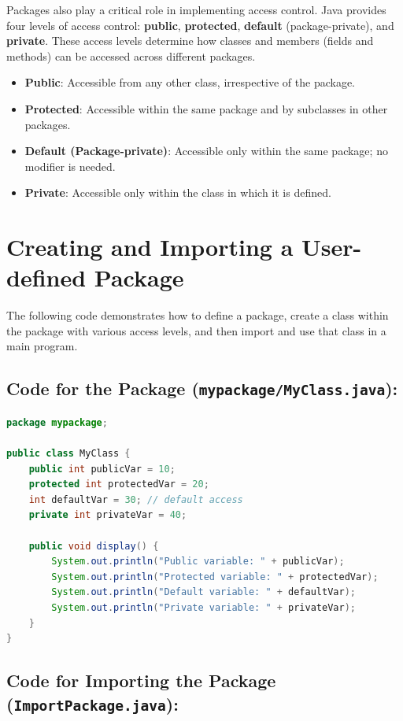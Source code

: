 \documentclass[a4paper,12pt]{article}
\begin{document}
Packages also play a critical role in implementing access control. Java provides four levels of access control: \textbf{public}, \textbf{protected}, \textbf{default} (package-private), and \textbf{private}. These access levels determine how classes and members (fields and methods) can be accessed across different packages.

\begin{itemize}
    \item \textbf{Public}: Accessible from any other class, irrespective of the package.
    \item \textbf{Protected}: Accessible within the same package and by subclasses in other packages.
    \item \textbf{Default (Package-private)}: Accessible only within the same package; no modifier is needed.
    \item \textbf{Private}: Accessible only within the class in which it is defined.
\end{itemize}

\section{Creating and Importing a User-defined Package}

The following code demonstrates how to define a package, create a class within the package with various access levels, and then import and use that class in a main program.

\subsection{Code for the Package (\texttt{mypackage/MyClass.java}):}

\begin{lstlisting}[language=Java]
package mypackage;

public class MyClass {
    public int publicVar = 10;
    protected int protectedVar = 20;
    int defaultVar = 30; // default access
    private int privateVar = 40;

    public void display() {
        System.out.println("Public variable: " + publicVar);
        System.out.println("Protected variable: " + protectedVar);
        System.out.println("Default variable: " + defaultVar);
        System.out.println("Private variable: " + privateVar);
    }
}
\end{lstlisting}

\subsection{Code for Importing the Package (\texttt{ImportPackage.java}):}
\end{document}
